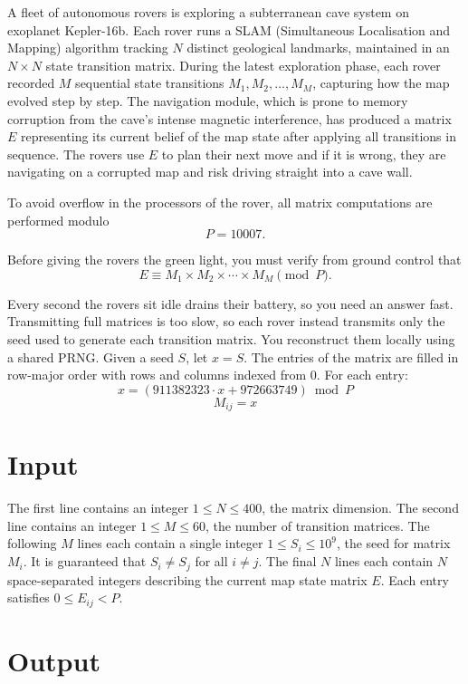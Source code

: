 
A fleet of autonomous rovers is exploring a subterranean cave system on exoplanet Kepler-16b.
Each rover runs a SLAM (Simultaneous Localisation and Mapping) algorithm tracking $N$ distinct
geological landmarks, maintained in an $N \times N$ state transition matrix. During the latest exploration phase, each rover recorded $M$ sequential state transitions
$M_1, M_2, \ldots, M_M$, capturing how the map evolved step by step. The navigation module,
which is prone to memory corruption from the cave's intense magnetic interference, has produced
a matrix $E$ representing its current belief of the map state after applying all transitions in
sequence. The rovers use $E$ to plan their next move and if it is wrong, they are navigating on
a corrupted map and risk driving straight into a cave wall.

To avoid overflow in the processors of the rover, all matrix computations are performed modulo
\[
P = 10007.
\]

Before giving the rovers the green light, you must verify from ground control that
\[
E \equiv M_1 \times M_2 \times \cdots \times M_M \pmod P.
\]

Every second the rovers sit idle drains their battery, so you need an answer fast. Transmitting full matrices is too slow, so each rover instead transmits only the seed used to generate each transition matrix. You reconstruct them locally using a shared PRNG. Given a seed $S$, let $x = S$. The entries of the matrix are filled in row-major order with rows and columns indexed from $0$. For each entry:
\[
x = (911382323 \cdot x + 972663749) \bmod P
\]
\[
M_{ij} = x
\]

\section*{Input}

The first line contains an integer $1 \leq N \leq 400$, the matrix dimension. The second line contains an integer $1 \leq M \leq 60$, the number of transition matrices. The following $M$ lines each contain a single integer $1 \leq S_i \leq 10^9$, the seed for matrix $M_i$. It is guaranteed that $S_i \neq S_j$ for all $i \neq j$. The final $N$ lines each contain $N$ space-separated integers describing the current map state matrix $E$. Each entry satisfies $0 \leq E_{ij} < P.$

\section*{Output}

